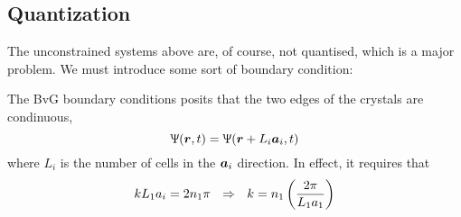 \subsection{Quantization}
The unconstrained systems above are, of course, not quantised, which is a major problem. We must introduce some sort of boundary condition:
\begin{thrm}
\label{fegbvk}
The BvG boundary conditions posits that the two edges of the crystals are condinuous, \ie
\begin{equation}
	\Uppsi(\boldsymbol{r},t)=\Uppsi(\boldsymbol{r}+L_i\boldsymbol{a}_i,t)
\end{equation}
where $L_i$ is the number of cells in the $\boldsymbol{a}_i$ direction. In effect, it requires that
\begin{equation}
	kL_1a_i=2n_1\pi\ \ \imp\ \ k=n_1\lf(\frac{2\pi}{L_1a_1} \rt)
\end{equation}
\end{thrm}
